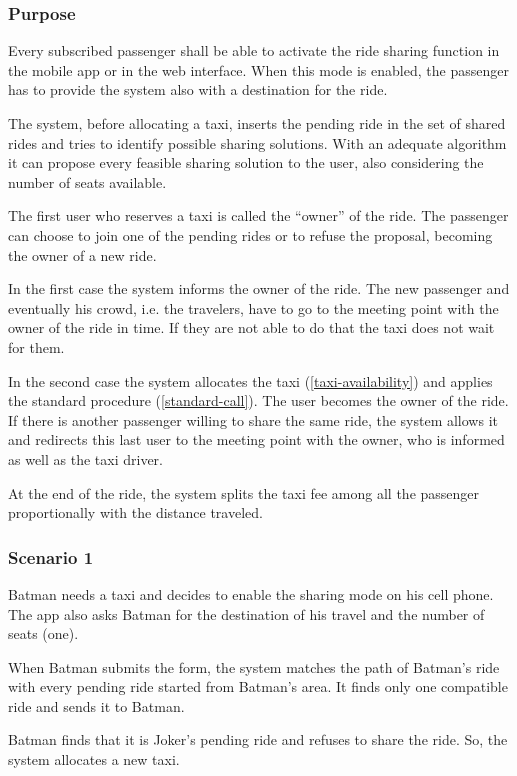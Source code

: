 \label{ride-sharing}
\subsubsection{Purpose}

Every subscribed passenger shall be able to activate the ride sharing function in the mobile app or in the web interface. When this mode is enabled, the passenger has to provide the system also with a destination for the ride.

The system, before allocating a taxi, inserts the pending ride in the set of shared rides and tries to identify possible sharing solutions.
With an adequate algorithm it can propose every feasible sharing solution to the user, also considering the number of seats available.

The first user who reserves a taxi is called the ``owner'' of the ride.
The passenger can choose to join one of the pending rides or to refuse the proposal, becoming the owner of a new ride.

In the first case the system informs the owner of the ride. The new passenger and eventually his crowd, i.e. the travelers, have to go to the meeting point with the owner of the ride in time. If they are not able to do that the taxi does not wait for them.

In the second case the system allocates the taxi (\ref{taxi-availability}) and applies the standard procedure (\ref{standard-call}).  The user becomes the owner of the ride.
If there is another passenger willing to share the same ride, the system allows it and redirects this last user to the meeting point with the owner, who is informed as well as the taxi driver.

At the end of the ride, the system splits the taxi fee among all the passenger proportionally with the distance traveled.

\subsubsection{Scenario 1}
Batman needs a taxi and decides to enable the sharing mode on his cell phone. The app also asks Batman for the destination of his travel and the number of seats (one).

When Batman submits the form, the system matches the path of Batman's ride with every pending ride started from Batman's area. It finds only one compatible ride and sends it to Batman.

Batman finds that it is Joker's pending ride and refuses to share the ride.
So, the system allocates a new taxi.

